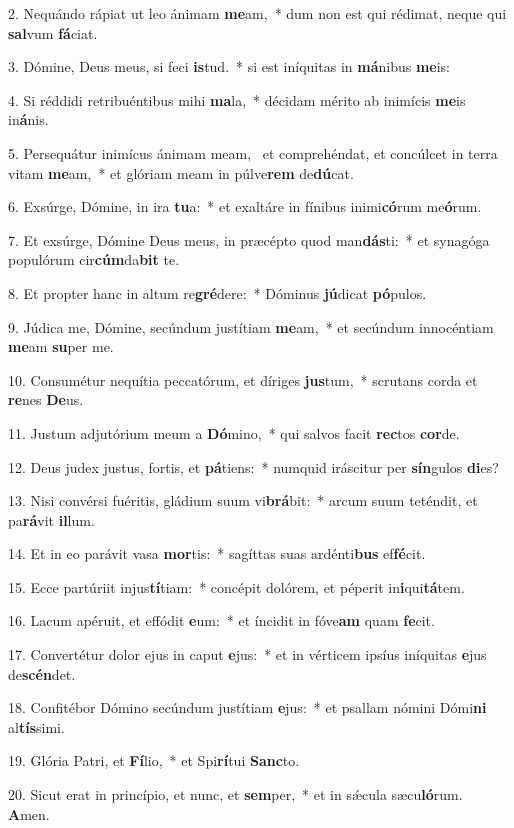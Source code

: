 2. Nequándo rápiat ut leo ánimam \textbf{me}am,~*  dum non est qui rédimat, neque qui \textbf{sal}vum \textbf{fá}ciat.\

3. Dómine, Deus meus, si feci \textbf{is}tud.~*  si est iníquitas in \textbf{má}nibus \textbf{me}is:\

4. Si réddidi retribuéntibus mihi \textbf{ma}la,~*  décidam mérito ab inimícis \textbf{me}is in\textbf{á}nis.\

5. Persequátur inimícus ánimam meam, \dag\  et comprehéndat, et concúlcet in terra vitam \textbf{me}am,~*  et glóriam meam in púlve\textbf{rem} de\textbf{dú}cat.\

6. Exsúrge, Dómine, in ira \textbf{tu}a:~*  et exaltáre in fínibus inimi\textbf{có}rum me\textbf{ó}rum.\

7. Et exsúrge, Dómine Deus meus, in præcépto quod man\textbf{dás}ti:~*  et synagóga populórum cir\textbf{cúm}da\textbf{bit} te.\

8. Et propter hanc in altum re\textbf{gré}dere:~*  Dóminus \textbf{jú}dicat \textbf{pó}pulos.\

9. Júdica me, Dómine, secúndum justítiam \textbf{me}am,~*  et secúndum innocéntiam \textbf{me}am \textbf{su}per me.\

10. Consumétur nequítia peccatórum, et díriges \textbf{jus}tum,~*  scrutans corda et \textbf{re}nes \textbf{De}us.\

11. Justum adjutórium meum a \textbf{Dó}mino,~*  qui salvos facit \textbf{rec}tos \textbf{cor}de.\

12. Deus judex justus, fortis, et \textbf{pá}tiens:~*  numquid iráscitur per \textbf{sín}gulos \textbf{di}es?\

13. Nisi convérsi fuéritis, gládium suum vi\textbf{brá}bit:~*  arcum suum teténdit, et pa\textbf{rá}vit \textbf{il}lum.\

14. Et in eo parávit vasa \textbf{mor}tis:~*  sagíttas suas ardénti\textbf{bus} ef\textbf{fé}cit.\

15. Ecce partúriit injus\textbf{tí}tiam:~*  concépit dolórem, et péperit in\textbf{i}qui\textbf{tá}tem.\

16. Lacum apéruit, et effódit \textbf{e}um:~*  et íncidit in fóve\textbf{am} quam \textbf{fe}cit.\

17. Convertétur dolor ejus in caput \textbf{e}jus:~*  et in vérticem ipsíus iníquitas \textbf{e}jus de\textbf{scén}det.\

18. Confitébor Dómino secúndum justítiam \textbf{e}jus:~*  et psallam nómini Dómi\textbf{ni} al\textbf{tís}simi.\

19. Glória Patri, et \textbf{Fí}lio,~*  et Spi\textbf{rí}tui \textbf{Sanc}to.\

20. Sicut erat in princípio, et nunc, et \textbf{sem}per,~*  et in sǽcula sæcu\textbf{ló}rum. \textbf{A}men.\

